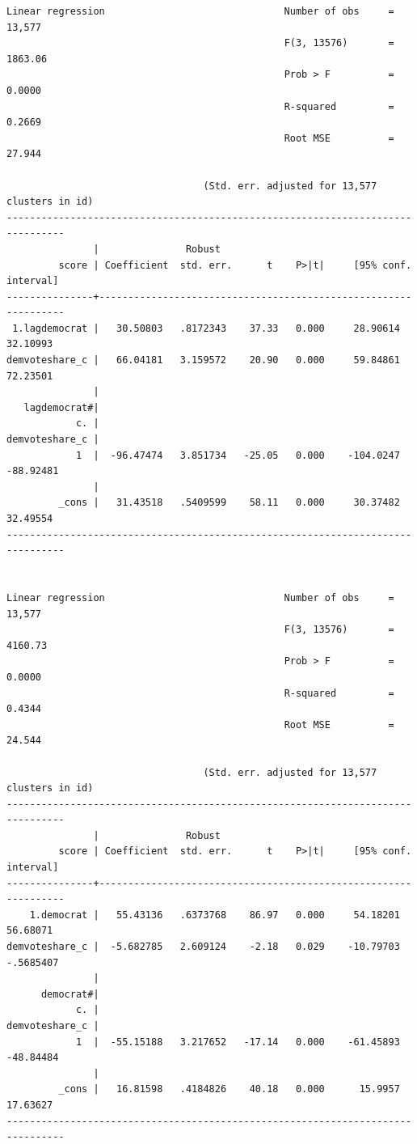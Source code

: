 \documentclass[
]{book}
\begin{document}
\begin{verbatim}
Linear regression                               Number of obs     =     13,577
                                                F(3, 13576)       =    1863.06
                                                Prob > F          =     0.0000
                                                R-squared         =     0.2669
                                                Root MSE          =     27.944

                                  (Std. err. adjusted for 13,577 clusters in id)
--------------------------------------------------------------------------------
               |               Robust
         score | Coefficient  std. err.      t    P>|t|     [95% conf. interval]
---------------+----------------------------------------------------------------
 1.lagdemocrat |   30.50803   .8172343    37.33   0.000     28.90614    32.10993
demvoteshare_c |   66.04181   3.159572    20.90   0.000     59.84861    72.23501
               |
   lagdemocrat#|
            c. |
demvoteshare_c |
            1  |  -96.47474   3.851734   -25.05   0.000    -104.0247   -88.92481
               |
         _cons |   31.43518   .5409599    58.11   0.000     30.37482    32.49554
--------------------------------------------------------------------------------


Linear regression                               Number of obs     =     13,577
                                                F(3, 13576)       =    4160.73
                                                Prob > F          =     0.0000
                                                R-squared         =     0.4344
                                                Root MSE          =     24.544

                                  (Std. err. adjusted for 13,577 clusters in id)
--------------------------------------------------------------------------------
               |               Robust
         score | Coefficient  std. err.      t    P>|t|     [95% conf. interval]
---------------+----------------------------------------------------------------
    1.democrat |   55.43136   .6373768    86.97   0.000     54.18201    56.68071
demvoteshare_c |  -5.682785   2.609124    -2.18   0.029    -10.79703   -.5685407
               |
      democrat#|
            c. |
demvoteshare_c |
            1  |  -55.15188   3.217652   -17.14   0.000    -61.45893   -48.84484
               |
         _cons |   16.81598   .4184826    40.18   0.000      15.9957    17.63627
--------------------------------------------------------------------------------



\end{verbatim}
\end{document}
